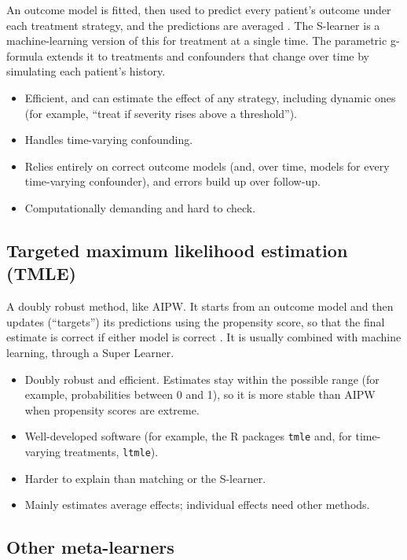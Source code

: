 An outcome model is fitted, then used to predict every patient's outcome under each treatment strategy, and the predictions are averaged \cite{robins1986gformula,hernan2020whatif}. The S-learner is a machine-learning version of this for treatment at a single time. The parametric g-formula extends it to treatments and confounders that change over time by simulating each patient's history.
\begin{itemize}
\item[$+$] Efficient, and can estimate the effect of any strategy, including dynamic ones (for example, ``treat if severity rises above a threshold'').
\item[$+$] Handles time-varying confounding.
\item[$-$] Relies entirely on correct outcome models (and, over time, models for every time-varying confounder), and errors build up over follow-up.
\item[$-$] Computationally demanding and hard to check.
\end{itemize}

\subsection{Targeted maximum likelihood estimation (TMLE)}

A doubly robust method, like AIPW. It starts from an outcome model and then updates (``targets'') its predictions using the propensity score, so that the final estimate is correct if either model is correct \cite{vanderlaan2006}. It is usually combined with machine learning, through a Super Learner.
\begin{itemize}
\item[$+$] Doubly robust and efficient. Estimates stay within the possible range (for example, probabilities between 0 and 1), so it is more stable than AIPW when propensity scores are extreme.
\item[$+$] Well-developed software (for example, the R packages \texttt{tmle} and, for time-varying treatments, \texttt{ltmle}).
\item[$-$] Harder to explain than matching or the S-learner.
\item[$-$] Mainly estimates average effects; individual effects need other methods.
\end{itemize}

\subsection{Other meta-learners}

